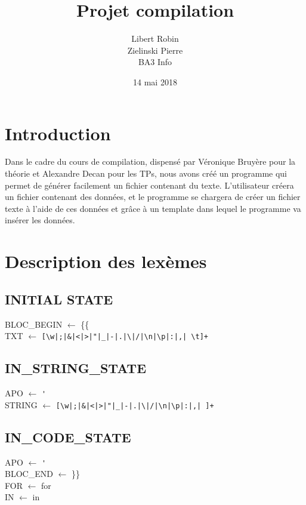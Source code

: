 ﻿\documentclass{report}
\title{Projet compilation}
\author{Libert Robin\\ Zielinski Pierre \\ BA3 Info}
\date{14 mai 2018}
\begin{document}
\maketitle

\section*{ Introduction}
Dans le cadre du cours de compilation, dispensé par Véronique Bruyère pour la théorie et Alexandre Decan pour les TPs, nous avons créé un programme qui permet de générer facilement un fichier contenant du texte. L'utilisateur créera un fichier contenant des données, et le programme se chargera de créer un fichier texte à l'aide de ces données et grâce à un template dans lequel le programme va insérer les données.

\section*{ Description des lexèmes}

\subsection*{INITIAL STATE}

BLOC\_BEGIN $\leftarrow$ \{\{\\

TXT $\leftarrow$ \verb![\w|;|&|<|>|"|_|-|.|\|/|\n|\p|:|,| \t]+!

\subsection*{IN\_STRING\_STATE}

APO $\leftarrow$ \verb!'!\\

STRING $\leftarrow$ \verb![\w|;|&|<|>|"|_|-|.|\|/|\n|\p|:|,| ]+!

\subsection*{IN\_CODE\_STATE}

APO $\leftarrow$ \verb!'!\\

BLOC\_END $\leftarrow$ \}\}\\

FOR $\leftarrow$ for\\

IN $\leftarrow$ in\\
\end{document}

